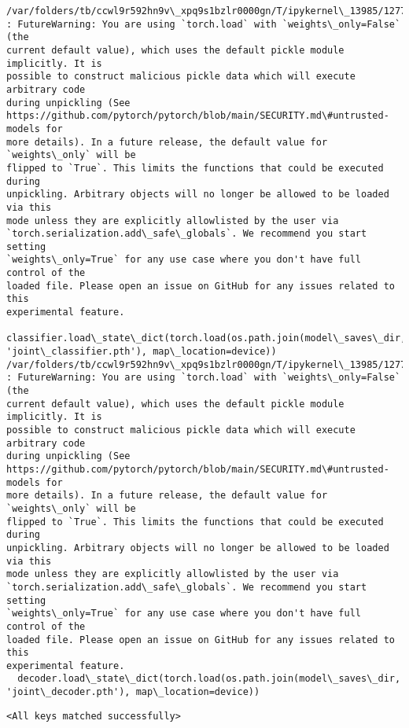 \documentclass[11pt]{article}
\makeatletter
\newcommand{\boxspacing}{\kern\kvtcb@left@rule\kern\kvtcb@boxsep}
\newcommand{\prompt}[4]{
        {\ttfamily\llap{{\color{#2}[#3]:\hspace{3pt}#4}}\vspace{-\baselineskip}}
    }
\makeatother
\begin{document}
    \begin{Verbatim}[commandchars=\\\{\}]
/var/folders/tb/ccwl9r592hn9v\_xpq9s1bzlr0000gn/T/ipykernel\_13985/1277527420.py:5
: FutureWarning: You are using `torch.load` with `weights\_only=False` (the
current default value), which uses the default pickle module implicitly. It is
possible to construct malicious pickle data which will execute arbitrary code
during unpickling (See
https://github.com/pytorch/pytorch/blob/main/SECURITY.md\#untrusted-models for
more details). In a future release, the default value for `weights\_only` will be
flipped to `True`. This limits the functions that could be executed during
unpickling. Arbitrary objects will no longer be allowed to be loaded via this
mode unless they are explicitly allowlisted by the user via
`torch.serialization.add\_safe\_globals`. We recommend you start setting
`weights\_only=True` for any use case where you don't have full control of the
loaded file. Please open an issue on GitHub for any issues related to this
experimental feature.
  classifier.load\_state\_dict(torch.load(os.path.join(model\_saves\_dir,
'joint\_classifier.pth'), map\_location=device))
/var/folders/tb/ccwl9r592hn9v\_xpq9s1bzlr0000gn/T/ipykernel\_13985/1277527420.py:6
: FutureWarning: You are using `torch.load` with `weights\_only=False` (the
current default value), which uses the default pickle module implicitly. It is
possible to construct malicious pickle data which will execute arbitrary code
during unpickling (See
https://github.com/pytorch/pytorch/blob/main/SECURITY.md\#untrusted-models for
more details). In a future release, the default value for `weights\_only` will be
flipped to `True`. This limits the functions that could be executed during
unpickling. Arbitrary objects will no longer be allowed to be loaded via this
mode unless they are explicitly allowlisted by the user via
`torch.serialization.add\_safe\_globals`. We recommend you start setting
`weights\_only=True` for any use case where you don't have full control of the
loaded file. Please open an issue on GitHub for any issues related to this
experimental feature.
  decoder.load\_state\_dict(torch.load(os.path.join(model\_saves\_dir,
'joint\_decoder.pth'), map\_location=device))
    \end{Verbatim}

            \begin{tcolorbox}[breakable, size=fbox, boxrule=.5pt, pad at break*=1mm, opacityfill=0]
\prompt{Out}{outcolor}{9}{\boxspacing}
\begin{Verbatim}[commandchars=\\\{\}]
<All keys matched successfully>
\end{Verbatim}
\end{tcolorbox}
        
\end{document}
